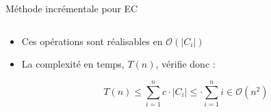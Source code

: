 \documentclass[aspectratio=1610,francais,envcountsect]{beamer}
\begin{document}
\begin{frame}[allowframebreaks]{Méthode incrémentale pour EC}
\begin{columns}
    \begin{column}{0.45\textwidth}
      \begin{center}
      \end{center}
    \end{column}
  \end{columns}

  \framebreak

  \begin{itemize}
  \item Ces opérations sont réalisables en $\mathcal{O}(|C_i|)$
  \item La complexité en temps, $T(n)$, vérifie donc :

    \begin{equation}
      \label{eq:ecit}
      T(n) \leq \sum_{i=1}^nc\cdot|C_i| \leq \cdot\sum_{i=1}^ni \in \mathcal{O}(n^2)
    \end{equation}
  \end{itemize}
\end{frame}

\newcommand{\drawECQuad}{%
  \node[point] (n1) at (0,0) {}; \node[point] (n2) at (2,-2) {};
  \node[point] (n3) at (4,-3) {}; \node[point] (n4bis) at (6,-1.5) {};
  \node[point] (n4) at (6.5,-0.5) {}; \node[point] (n5) at (6,0.75)
  {}; \node[point] (n6) at (3.5,1.75) {}; \node[point] (n7) at (1,1.5)
  {}; }
\end{document}
